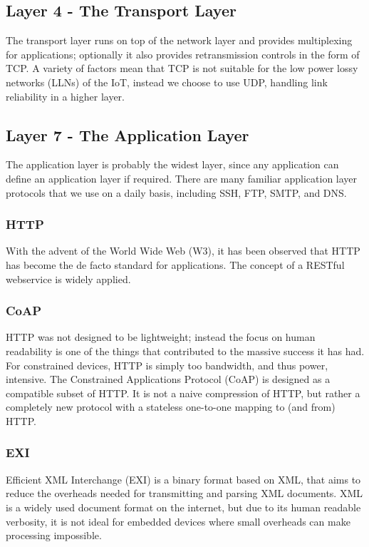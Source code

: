 \documentclass[10pt,journal,compsoc]{IEEEtran}
\begin{document}
\subsection{Layer 4 - The Transport Layer}
The transport layer runs on top of the network layer and provides multiplexing
for applications; optionally it also provides retransmission controls in the
form of TCP. A variety of factors mean that TCP is not suitable for the
low power lossy networks (LLNs) of the IoT, instead we choose to use UDP,
handling link reliability in a higher layer.

\subsection{Layer 7 - The Application Layer}
The application layer is probably the widest layer, since any application can
define an application layer if required. There are many familiar
application layer protocols that we use on a daily basis, including SSH,
FTP, SMTP, and DNS. 

\subsubsection{HTTP} 
With the advent of the World Wide Web (W3), it has been observed that HTTP has
become the de facto standard for applications. The concept of a RESTful
webservice is widely applied.  

\subsubsection{CoAP}
HTTP was not designed to be lightweight; instead the focus on human readability
is one of the things that contributed to the massive success it has had. For
constrained devices, HTTP is simply too bandwidth, and thus power, intensive.
The Constrained Applications Protocol (CoAP) is designed as a compatible subset
of HTTP. It is not a naive compression of HTTP, but rather a completely new
protocol with a stateless one-to-one mapping to (and from) HTTP. 

\subsubsection{EXI}
Efficient XML Interchange (EXI) is a binary format based on XML, that aims to
reduce the overheads needed for transmitting and parsing XML documents. XML is
a widely used document format on the internet, but due to its human readable
verbosity, it is not ideal for embedded devices where small overheads can make
processing impossible. 
\end{document}
